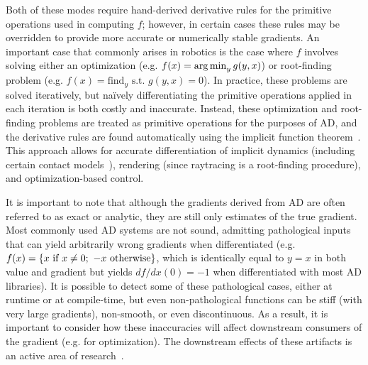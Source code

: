 Both of these modes require hand-derived derivative rules for the primitive operations used in computing $f$; however, in certain cases these rules may be overridden to provide more accurate or numerically stable gradients. An important case that commonly arises in robotics is the case where $f$ involves solving either an optimization (e.g. $f(x) = \operatorname*{arg\,min}_y g(y, x)$) or root-finding problem (e.g. $f(x) = \text{find}_y \text{ s.t. } g(y, x) = 0$). In practice, these problems are solved iteratively, but na\"ively differentiating the primitive operations applied in each iteration is both costly and inaccurate. Instead, these optimization and root-finding problems are treated as primitive operations for the purposes of AD, and the derivative rules are found automatically using the implicit function theorem~\cite{agrawalDifferentiableConvexOptimization2019}. This approach allows for accurate differentiation of implicit dynamics (including certain contact models~\cite{howelllecleach2022}), rendering (since raytracing is a root-finding procedure), and optimization-based control.

It is important to note that although the gradients derived from AD are often referred to as exact or analytic, they are still only estimates of the true gradient. Most commonly used AD systems are not sound, admitting pathological inputs that can yield arbitrarily wrong gradients when differentiated (e.g. $f(x) = \left\{x \text{ if } x \neq 0;\ -x \text{ otherwise}\right\}$, which is identically equal to $y = x$ in both value and gradient but yields $df/dx(0) = -1$ when differentiated with most AD libraries). It is possible to detect some of these pathological cases, either at runtime or at compile-time, but even non-pathological functions can be stiff (with very large gradients), non-smooth, or even discontinuous. As a result, it is important to consider how these inaccuracies will affect downstream consumers of the gradient (e.g. for optimization). The downstream effects of these artifacts is an active area of research~\cite{suh2021_bundled_gradients,suhDifferentiableSimulatorsGive2022,metzGradientsAreNot2022}.

